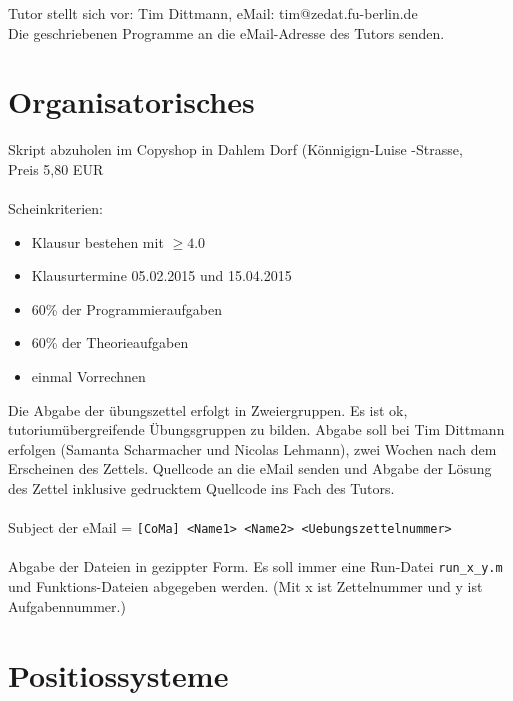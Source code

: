 \documentclass{llncs}
\begin{document}
Tutor stellt sich vor: Tim Dittmann, eMail: tim@zedat.fu-berlin.de\\
Die geschriebenen Programme an die eMail-Adresse des Tutors senden.

\section*{Organisatorisches}

Skript abzuholen im Copyshop in Dahlem Dorf (K\"onnigign-Luise -Strasse,\\
Preis 5,80 EUR\\
\\
Scheinkriterien:
\begin{itemize}
\item Klausur bestehen mit $\geq 4.0$
\item Klausurtermine 05.02.2015 und 15.04.2015
\item 60\% der Programmieraufgaben
\item 60\% der Theorieaufgaben
\item einmal Vorrechnen
\end{itemize}
Die Abgabe der \"ubungszettel erfolgt in Zweiergruppen. Es ist ok, tutorium\"ubergreifende \"Ubungsgruppen zu bilden.
Abgabe soll bei Tim Dittmann erfolgen (Samanta Scharmacher und Nicolas Lehmann), zwei Wochen nach dem Erscheinen des Zettels. Quellcode an die eMail senden und Abgabe der L\"osung des Zettel inklusive gedrucktem Quellcode ins Fach des Tutors.\\
\\
Subject der eMail = \texttt{[CoMa] <Name1> <Name2> <Uebungszettelnummer>}\\
\\
Abgabe der Dateien in gezippter Form. Es soll immer eine Run-Datei \texttt{run\_x\_y.m} und Funktions-Dateien abgegeben werden. (Mit x ist Zettelnummer und y ist Aufgabennummer.)

\section*{Positiossysteme}
\end{document}
